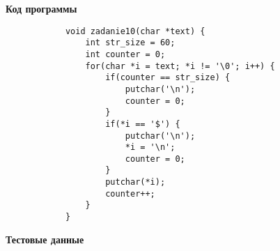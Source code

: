 \documentclass[12pt, a4paper]{article}
\begin{document}
		{\textbf{Код программы}}\par
		\begin{verbatim}
			void zadanie10(char *text) {
				int str_size = 60;
				int counter = 0;
				for(char *i = text; *i != '\0'; i++) {
					if(counter == str_size) {
						putchar('\n');
						counter = 0;
					}
					if(*i == '$') {
						putchar('\n');
						*i = '\n';
						counter = 0;
					}
					putchar(*i);
					counter++;
				}
			}
		\end{verbatim}

		{\textbf{Тестовые данные}\par

		}
\end{document}
